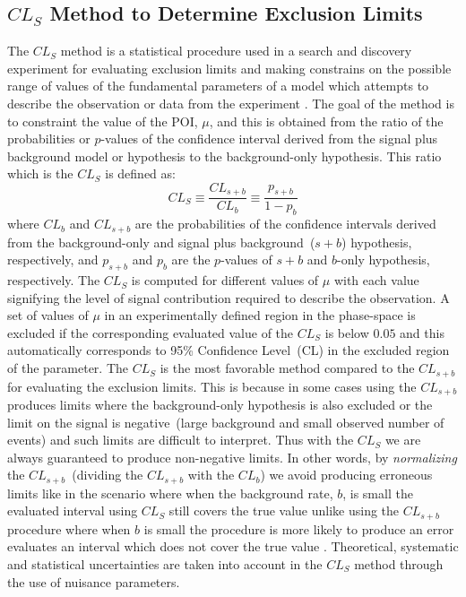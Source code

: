 \subsection{$CL_{S}$ Method to Determine Exclusion Limits}
The $CL_{S}$ method is a statistical procedure used in a search and discovery experiment for evaluating exclusion limits and making constrains on the possible range of values of the fundamental parameters of a model which attempts to describe the observation or data from the experiment \cite{CLS}. The goal of the method is to constraint the value of the POI, $\mu$, and this is obtained from the ratio of the probabilities or $p$-values of the confidence interval derived from the signal plus background model or hypothesis to the background-only hypothesis. This ratio which is the $CL_{S}$ is defined as: 
\begin{equation}
CL_{S}  \equiv  \frac{CL_{s+b}}{CL_{b}} \equiv \frac{p_{s+b}}{1 - p_{b}}
\end{equation}
where $CL_{b}$ and $CL_{s+b}$ are the  probabilities of the confidence intervals derived from the background-only and signal plus background~($s+b$) hypothesis, respectively, and $p_{s+b}$ and $p_{b}$ are the $p$-values of $s+b$ and $b$-only hypothesis, respectively. 
The $CL_{S}$ is computed for different values of $\mu$ with each value signifying the level of signal contribution required to describe the observation. A set of values of $\mu$ in an experimentally defined region in the phase-space is excluded if the corresponding evaluated value of the $CL_{S}$ is below $0.05$ and this automatically corresponds to 95\% Confidence Level~(CL) in the excluded region of the parameter.
\newline
The $CL_{S}$ is the most favorable method compared to the $CL_{s+b}$ for evaluating the exclusion limits. This is because in some cases using the $CL_{s+b}$ produces limits where the background-only hypothesis is also excluded or the limit on the signal is negative~(large background and small observed number of events) and such limits are difficult to interpret. Thus with the $CL_{S}$ we are always guaranteed to produce non-negative limits. In other words, by \textit{normalizing} the $CL_{s+b}$~(dividing the $CL_{s+b}$ with the $CL_{b}$) we avoid producing erroneous limits like in the scenario where when the background rate, $b$, is small the evaluated interval using $CL_{S}$ still covers the true value unlike using the $CL_{s+b}$ procedure where when $b$ is small the procedure is more likely to produce an error \ie evaluates an interval which does not cover the true value \cite{LIM}. 
\newline
Theoretical, systematic and statistical uncertainties are taken into account in the $CL_{S}$ method through the use of nuisance parameters.

